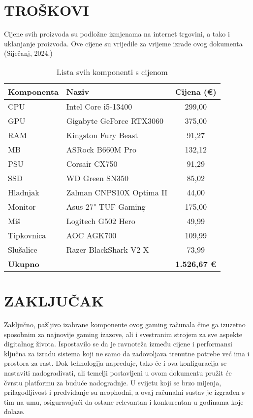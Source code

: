 \documentclass[14pt]{article}
\begin{document}
\clearpage
\section{TROŠKOVI}
Cijene svih proizvoda su podložne izmjenama na internet trgovini, a tako i uklanjanje proizvoda. Ove cijene su vrijedile za vrijeme izrade ovog dokumenta (Siječanj, 2024.)

\begin{table}[ht]
    \centering
    \begin{tabular}{llc}
        \toprule %
        \textbf{Komponenta} & \textbf{Naziv} & \textbf{Cijena (€)} \\
        \midrule %
        CPU & Intel Core i5-13400 & 299,00 \\
        GPU & Gigabyte GeForce RTX3060 & 375,00 \\
        RAM & Kingston Fury Beast & 91,27 \\
        MB & ASRock B660M Pro & 132,12 \\
        PSU & Corsair CX750 & 91,29 \\
        SSD & WD Green SN350 & 85,02 \\
        Hladnjak & Zalman CNPS10X Optima II & 44,00 \\
        Monitor & Asus 27" TUF Gaming & 175,00 \\
        Miš & Logitech G502 Hero & 49,99 \\
        Tipkovnica & AOC AGK700 & 109,99 \\
        Slušalice & Razer BlackShark V2 X & 73,99 \\
        \midrule %
        \textbf{Ukupno} & & \textbf{1.526,67 €} \\ %
        \bottomrule %
    \end{tabular}
    \caption{Lista svih komponenti s cijenom}
    \label{tab:Komponente}
\end{table}

\clearpage
\section{ZAKLJUČAK}
Zaključno, pažljivo izabrane komponente ovog gaming računala čine ga izuzetno sposobnim za najnovije gaming izazove, ali i svestranim strojem za sve aspekte digitalnog života. Ispostavilo se da je ravnoteža između cijene i performansi ključna za izradu sistema koji ne samo da zadovoljava trenutne potrebe već ima i prostora za rast. Dok tehnologija napreduje, tako će i ova konfiguracija se nastaviti nadograđivati, ali temelji postavljeni u ovom dokumentu pružit će čvrstu platformu za buduće nadogradnje. U svijetu koji se brzo mijenja, prilagodljivost i predviđanje su neophodni, a ovaj računalni sustav je izgrađen s tim na umu, osiguravajući da ostane relevantan i konkurentan u godinama koje dolaze.
\end{document}
